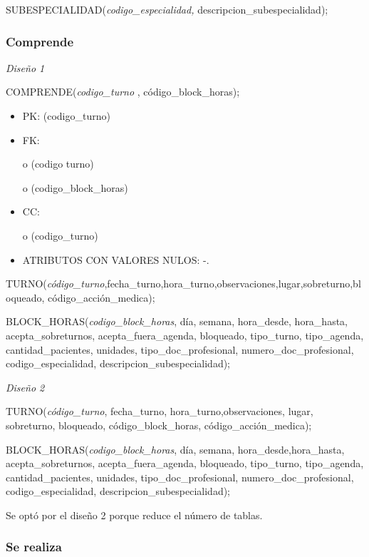 \documentclass[a4paper,11pt]{article}
\begin{document}
SUBESPECIALIDAD(\emph{codigo\_especialidad, }descripcion\_subespecialidad);\label{HToc293405849}

\subsubsection{\textbf{Comprende}}

\textit{Diseño 1}

COMPRENDE(\emph{codigo\_turno} , código\_block\_horas);

\begin{itemize}
\item PK: (codigo\_turno)

\item FK: 

o (codigo turno)

o (codigo\_block\_horas)

\item CC:

o (codigo\_turno)

\item ATRIBUTOS CON VALORES NULOS:  -.
\end{itemize}

TURNO(\emph{código\_turno},fecha\_turno,hora\_turno,observaciones,lugar,sobreturno,bloqueado, 
código\_acción\_medica);

BLOCK\_HORAS(\emph{codigo\_block\_horas}, día, semana, hora\_desde, hora\_hasta, 
acepta\_sobreturnos, acepta\_fuera\_agenda, bloqueado, tipo\_turno, tipo\_agenda, 
cantidad\_pacientes, unidades,\emph{ }tipo\_doc\_profesional, numero\_doc\_profesional, 
codigo\_especialidad, descripcion\_subespecialidad);

\textit{Diseño 2}

TURNO(\emph{código\_turno}, fecha\_turno, hora\_turno,observaciones, lugar, sobreturno, 
bloqueado, código\_block\_horas, código\_acción\_medica);

BLOCK\_HORAS(\emph{codigo\_block\_horas}, día, semana, hora\_desde,hora\_hasta, 
acepta\_sobreturnos, acepta\_fuera\_agenda, bloqueado, tipo\_turno, tipo\_agenda, 
cantidad\_pacientes, unidades,\emph{ }tipo\_doc\_profesional, numero\_doc\_profesional, 
codigo\_especialidad, descripcion\_subespecialidad);

Se optó por el diseño 2 porque reduce el número de tablas.\label{HToc293405850}

\subsubsection{\textbf{Se realiza}}
\end{document}
